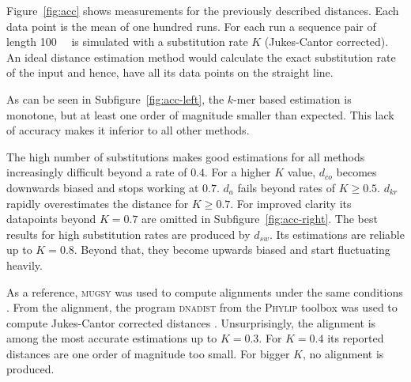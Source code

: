 \documentclass[a4paper,
  10pt,
  english,
  DIV=12,
  BCOR=8mm]{scrbook}
\newcommand{\algo}[1]{\textsc{{#1}}}
\begin{document}
Figure~\ref{fig:acc} shows measurements for the previously described distances. Each data point is the mean of one hundred runs. For each run a sequence pair of length \SI{100}{\kilo\basepairs} is simulated with a substitution rate $K$ (Jukes-Cantor corrected). An ideal distance estimation method would calculate the exact substitution rate of the input and hence, have all its data points on the straight line.

As can be seen in Subfigure~\ref{fig:acc-left}, the $k$-mer based estimation is monotone, but at least one order of magnitude smaller than expected. This lack of accuracy makes it inferior to all other methods.

The high number of substitutions makes good estimations for all methods increasingly difficult beyond a rate of $0.4$. For a higher $K$ value, $d_{co}$ becomes downwards biased and stops working at $0.7$. $d_a$ fails beyond rates of $K \ge 0.5$. $d_{kr}$ rapidly overestimates the distance for $K \ge 0.7$. For improved clarity its datapoints beyond $K = 0.7$ are omitted in Subfigure~\ref{fig:acc-right}. The best results for high substitution rates are produced by $d_{sw}$. Its estimations are reliable up to $K= 0.8$. Beyond that, they become upwards biased and start fluctuating heavily.

As a reference, \algo{mugsy} was used to compute alignments under the same conditions \cite{mugsy}. From the alignment, the program \algo{dnadist} from the \algo{Phylip} toolbox was used to compute Jukes-Cantor corrected distances \cite{phylip}. Unsurprisingly, the alignment is among the most accurate estimations up to $K = 0.3$. For $K=0.4$ its reported distances are one order of magnitude too small. For bigger $K$, no alignment is produced.




\end{document}
